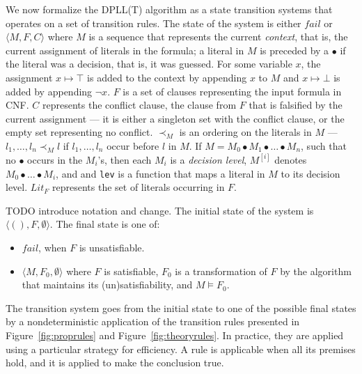 \documentclass[11pt]{article}
\begin{document}
	We now formalize the DPLL(T) algorithm 
	as a state transition systems that 
	operates on a set of transition rules. 
	The state of the system is either 
	$fail$ or $\langle M, F, C \rangle$ 
	where $M$ is a sequence that 
	represents the current 
	\textit{context}, that is, 
	the current assignment of literals in 
	the formula; a literal in $M$ is 
	preceded by a $\bullet$ if the literal 
	was a decision, that is, it was 
	guessed. For some variable $x$, 
	the assignment $x \mapsto \top$ is added 
	to the context by appending $x$ to 
	$M$ and $x \mapsto \bot$ is added by 
	appending $\neg x$. $F$ is a set of 
	clauses representing the input formula 
	in CNF. $C$ represents the conflict 
	clause, the clause from $F$ that is 
	falsified by the current assignment ---
	it is either a singleton set with 
	the conflict clause, or the empty 
	set representing no conflict. 
	$\prec_M$ is an ordering 
	on the literals in $M$ ---
	$l_1, \ldots, l_n \prec_M l$ if 
	$l_1, \ldots, l_n$ occur before 
	$l$ in $M$. If $M = M_0 
	\bullet M_1 \bullet \ldots \bullet M_n$, 
	such that no $\bullet$ occurs in 
	the $M_i$'s, then each $M_i$ is a
	\textit{decision level}, $M^{[i]}$ 
	denotes $M_0 \bullet \ldots \bullet M_i$,
	and and \texttt{lev} is a function 
	that maps a literal in $M$ to its 
	decision level. $Lit_F$ represents the 
	set of literals occurring in $F$.
	
	TODO introduce notation and change.
	The initial state of the system is 
	$\langle (), F, \emptyset \rangle$. 
	The final state is one of:
	\begin{itemize}
		\item $fail$, when $F$ is 
		unsatisfiable.
		\item $\langle M, F_0, \emptyset \rangle$ 
		where $F$ is satisfiable, $F_0$ is 
		a transformation of $F$ by the 
		algorithm that maintains its 
		(un)satisfiability,	and $M 
		\models F_0$.
	\end{itemize}
	
	The transition system goes from the 
	initial state to one of the possible 
	final states by a nondeterministic 
	application of the transition rules 
	presented in Figure~\ref{fig:proprules} 
	and Figure~\ref{fig:theoryrules}. In 
	practice, they are applied using a 
	particular strategy for efficiency.
	A rule is applicable when all its 
	premises hold, and it is applied to 
	make the conclusion true. 
\end{document}
